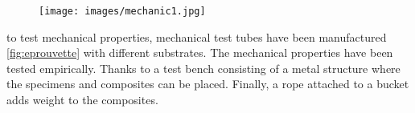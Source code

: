 \begin{figure}[h]
    \centering
    \texttt{[image: images/mechanic1.jpg]}
    \caption{}
    \label{fig:mechanic test machine}
\end{figure} 

to test mechanical properties, mechanical test tubes have been manufactured \ref{fig:eprouvette} with different substrates. The mechanical properties have been tested empirically. Thanks to a test bench consisting of a metal structure where the specimens and composites can be placed. Finally, a rope attached to a bucket adds weight to the composites. 

